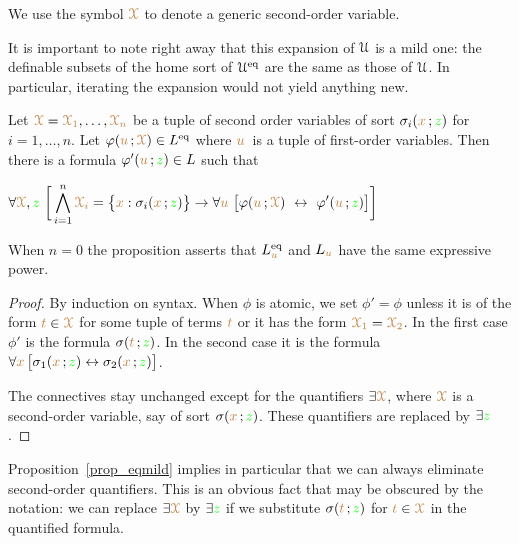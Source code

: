 \documentclass[creche.tex]{subfiles}
\begin{document}
We use the symbol ${\color{brown}\EuScript X}$ to denote a generic second-order variable.


It is important to note right away that this expansion of $\EuScript U$ is a mild one: the definable subsets of the home sort of $\EuScript U^{{\rm eq}}$ are the same as those of $\EuScript U$. In particular, iterating the expansion would not yield anything new. 



\begin{proposition}\label{prop_eqmild}
Let ${\color{brown}\EuScript X}={\color{brown}\EuScript X_1},\dots,{\color{brown}\EuScript X_n}$ be a tuple of second order variables of sort $\sigma_i({\color{brown} x}\,;{\color{green} z})$ for $i=1,\dots,n$. Let $\varphi({\color{brown} u}\,;{\color{brown}\EuScript X})\in L^{{\rm eq}}$ where ${\color{brown} u}\,$ is a tuple of first-order variables. Then there is a formula $\varphi'({\color{brown} u}\,;{\color{green} z})\in L$ such that 

\hfil$\displaystyle\A {\vl\X},{\gr z}\ \bigg[\bigwedge^n_{i=1}{\vl\X_i}=\big\{{\mr x}:\sigma_i({\mr x}\,;{\gr z})\big\}\imp\A {\mr u}\ \big[\phi({\mr u}\,;{\vl\X})\ \iff\ \phi'({\mr u}\,;{\gr z})\big]\bigg]$

\end{proposition}

When $n=0$ the proposition asserts that $L_{{\color{brown} u}}^{{\rm eq}}$ and $L_{{\color{brown} u}}$ have the same expressive power.

\begin{proof}
By induction on syntax. When $\phi$ is atomic, we set $\phi'=\phi$ unless it is of the form ${\color{brown} t}\in {\color{brown}\EuScript X}$ for some tuple of terms ${\color{brown} t}$ or it has the form ${\color{brown}\EuScript X_1}={\color{brown}\EuScript X_2}$. In the first case $\phi'$ is the formula $\sigma({\color{brown} t}\,;{\color{green} z})$. In the second case it is the formula $\forall {\color{brown}x}\,\big[\sigma_1({\color{brown} x}\,;{\color{green} z}) \leftrightarrow\sigma_2({\color{brown} x}\,;{\color{green} z})\big]$.

The connectives stay unchanged except for the quantifiers $\exists {\color{brown}\EuScript X}$, where ${\color{brown}\EuScript X}$ is a second-order variable, say of sort $\sigma({\color{brown} x}\,;{\color{green} z})$. These quantifiers are replaced by $\exists{\color{green}z}$.
\end{proof}

Proposition~\ref{prop_eqmild} implies in particular that we can always eliminate second-order quantifiers. This is an obvious fact that may be obscured by the notation: we can replace $\exists {\color{brown}\EuScript X}$ by $\exists {\color{green}z}$ if we substitute  $\sigma({\color{brown} t}\,;{\color{green} z})$ for ${\color{brown} t}\in {\color{brown}\EuScript X}$ in the quantified formula.
\end{document}
